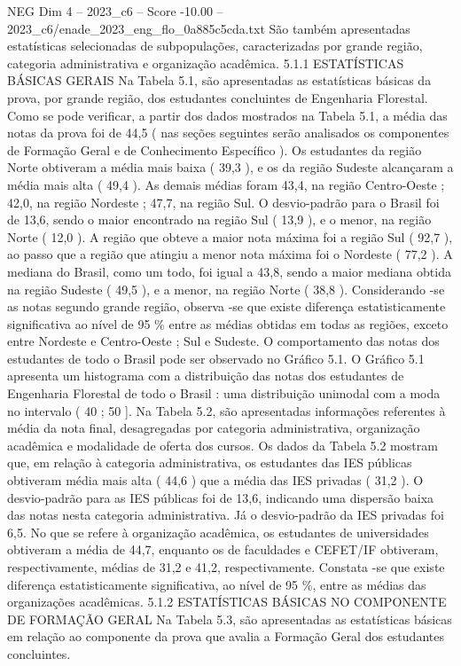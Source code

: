 \begin{textsample}{NEG Dim 4 – 2023\_c6 – Score -10.00 – 2023\_c6/enade\_2023\_eng\_flo\_0a885c5cda.txt}
São também apresentadas estatísticas selecionadas de subpopulações, caracterizadas por grande região, categoria administrativa e organização acadêmica. 5.1.1 ESTATÍSTICAS BÁSICAS GERAIS Na Tabela 5.1, são apresentadas as estatísticas básicas da prova, por grande região, dos estudantes concluintes de Engenharia Florestal.
Como se pode verificar, a partir dos dados mostrados na Tabela 5.1, a média das notas da prova foi de 44,5 ( nas seções seguintes serão analisados os componentes de Formação Geral e de Conhecimento Específico ).
Os estudantes da região Norte obtiveram a média mais baixa ( 39,3 ), e os da região Sudeste alcançaram a média mais alta ( 49,4 ).
As demais médias foram 43,4, na região Centro-Oeste ; 42,0, na região Nordeste ; 47,7, na região Sul.
O desvio-padrão para o Brasil foi de 13,6, sendo o maior encontrado na região Sul ( 13,9 ), e o menor, na região Norte ( 12,0 ).
A região que obteve a maior nota máxima foi a região Sul ( 92,7 ), ao passo que a região que atingiu a menor nota máxima foi o Nordeste ( 77,2 ).
A mediana do Brasil, como um todo, foi igual a 43,8, sendo a maior mediana obtida na região Sudeste ( 49,5 ), e a menor, na região Norte ( 38,8 ).
Considerando -se as notas segundo grande região, observa -se que existe diferença estatisticamente significativa ao nível de 95 \% entre as médias obtidas em todas as regiões, exceto entre Nordeste e Centro-Oeste ; Sul e Sudeste.
O comportamento das notas dos estudantes de todo o Brasil pode ser observado no Gráfico 5.1.
O Gráfico 5.1 apresenta um histograma com a distribuição das notas dos estudantes de Engenharia Florestal de todo o Brasil : uma distribuição unimodal com a moda no intervalo ( 40 ; 50 ].
Na Tabela 5.2, são apresentadas informações referentes à média da nota final, desagregadas por categoria administrativa, organização acadêmica e modalidade de oferta dos cursos.
Os dados da Tabela 5.2 mostram que, em relação à categoria administrativa, os estudantes das IES públicas obtiveram média mais alta ( 44,6 ) que a média das IES privadas ( 31,2 ).
O desvio-padrão para as IES públicas foi de 13,6, indicando uma dispersão baixa das notas nesta categoria administrativa.
Já o desvio-padrão da IES privadas foi 6,5.
No que se refere à organização acadêmica, os estudantes de universidades obtiveram a média de 44,7, enquanto os de faculdades e CEFET/IF obtiveram, respectivamente, médias de 31,2 e 41,2, respectivamente.
Constata -se que existe diferença estatisticamente significativa, ao nível de 95 \%, entre as médias das organizações acadêmicas. 5.1.2 ESTATÍSTICAS BÁSICAS NO COMPONENTE DE FORMAÇÃO GERAL Na Tabela 5.3, são apresentadas as estatísticas básicas em relação ao componente da prova que avalia a Formação Geral dos estudantes concluintes.

\end{textsample}

